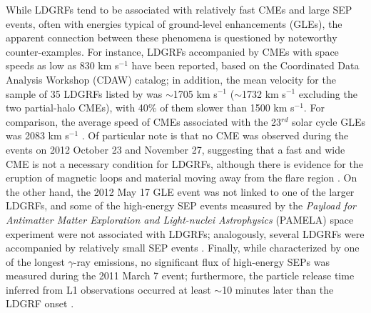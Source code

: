 \documentclass{aastex61}
\begin{document}
While LDGRFs tend to be associated with relatively fast CMEs and large SEP events, often with energies typical of ground-level enhancements (GLEs), the apparent connection between these phenomena is questioned by noteworthy
counter-examples.
For instance, LDGRFs accompanied by CMEs with space speeds as low as 830 km s$^{-1}$ have been reported, based on the Coordinated Data Analysis Workshop (CDAW) catalog;
in addition, the mean velocity for the sample of 35 LDGRFs listed by 
\citet{ref:DENOLFO2019} was $\sim$1705 km s$^{-1}$ ($\sim$1732 km s$^{-1}$ excluding the two partial-halo CMEs), with 40\% of them slower than 1500 km s$^{-1}$. For comparison, the average speed of CMEs associated with the 23$^{rd}$ solar cycle GLEs was 2083 km s$^{-1}$ \citep{ref:GOPALSWAMY2012}.
Of particular note is that no CME was observed during the events on 2012 October 23 and November 27, 
suggesting that a fast and wide CME is not a necessary condition for LDGRFs,
although there is evidence for the eruption of magnetic loops and material moving away from the flare region \citep{ref:SHARE2018}. On the other hand, 
the 2012 May 17 GLE event was not linked to one of the larger LDGRFs, and
some of the high-energy SEP events measured by the \textit{Payload for Antimatter Matter Exploration and Light-nuclei Astrophysics} (PAMELA) space experiment were not associated with LDGRFs;
analogously,
several LDGRFs were accompanied by relatively small SEP events \citep{ref:DENOLFO2019}. Finally, while characterized by one of the longest $\gamma$-ray emissions, no significant flux of high-energy SEPs was measured during the 2011 March 7 event;
furthermore, the particle release time inferred from L1 observations occurred at least $\sim$10 minutes later than the LDGRF onset \citep{ref:KAHLER2018,ref:KLEIN2018}. 
\end{document}
